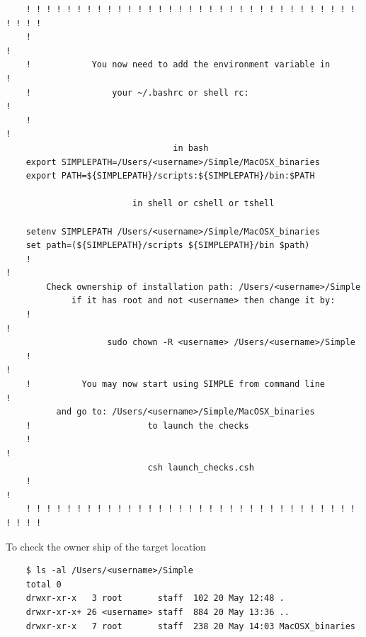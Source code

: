 \documentclass[a4paper,11pt]{article}
\begin{document}
\begin{verbatim}
    ! ! ! ! ! ! ! ! ! ! ! ! ! ! ! ! ! ! ! ! ! ! ! ! ! ! ! ! ! ! ! ! ! ! ! ! !
    !                                                                       !
    !            You now need to add the environment variable in            !
    !                your ~/.bashrc or shell rc:                            !
    !                                                                       !
                                 in bash                                     
    export SIMPLEPATH=/Users/<username>/Simple/MacOSX_binaries 
    export PATH=${SIMPLEPATH}/scripts:${SIMPLEPATH}/bin:$PATH        
                                                                                                                 
                         in shell or cshell or tshell                        
                                           
    setenv SIMPLEPATH /Users/<username>/Simple/MacOSX_binaries
    set path=(${SIMPLEPATH}/scripts ${SIMPLEPATH}/bin $path)
    !                                                                       !
        Check ownership of installation path: /Users/<username>/Simple                   
             if it has root and not <username> then change it by:                 
    !                                                                       !
                    sudo chown -R <username> /Users/<username>/Simple                         
    !                                                                       !
    !          You may now start using SIMPLE from command line             !
          and go to: /Users/<username>/Simple/MacOSX_binaries                            
    !                       to launch the checks                             
    !                                                                       !
                            csh launch_checks.csh                            
    !                                                                       !
    ! ! ! ! ! ! ! ! ! ! ! ! ! ! ! ! ! ! ! ! ! ! ! ! ! ! ! ! ! ! ! ! ! ! ! ! !
\end{verbatim}
To check the owner ship of the target location
\begin{verbatim}
    $ ls -al /Users/<username>/Simple
    total 0
    drwxr-xr-x   3 root       staff  102 20 May 12:48 .
    drwxr-xr-x+ 26 <username> staff  884 20 May 13:36 ..
    drwxr-xr-x   7 root       staff  238 20 May 14:03 MacOSX_binaries
\end{verbatim}
\end{document}

